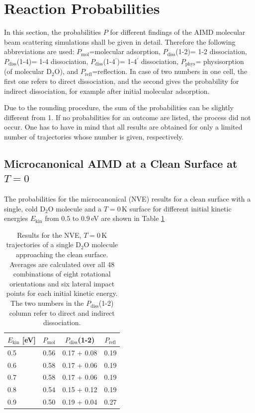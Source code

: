 \documentclass[11pt,DIV=13,BCOR=5mm,a4paper,headinclude]{scrbook}
\begin{document}
\section{Reaction Probabilities}\label{reactionprobabilities}
In this section, the probabilities $P$ for different findings of the AIMD molecular beam scattering simulations shall be given in detail.
Therefore the following abbreviations are used: $P_\textrm{mol}$=molecular adsorption, 
 $P_\textrm{diss}$(1-2)= 1-2 dissociation, $P_\textrm{diss}$(1-4)= 1-4 dissociation, $P_\textrm{diss}$(1-4$^\prime$)= 1-4$^\prime$ dissociation, $P_\textrm{phys}$= physisorption (of molecular D$_2$O), and $P_\textrm{refl}$=reflection.
In case of two numbers in one cell, the first one refers to direct dissociation, and the second gives the probability for indirect dissociation, for example after initial molecular adsorption.


Due to the rounding procedure, the sum of the probabilities can be slightly different from 1.
If no probabilities for an outcome are listed, the process did not occur.
One has to have in mind that all results are obtained for only a limited number of trajectories whose number is given, respectively.


\subsection{Microcanonical AIMD at a Clean Surface at $T=0$}
The probabilities for the microcanonical (NVE) results for a clean surface with a single, cold D$_2$O molecule and a $T=0\,$K surface for different initial kinetic energies $E_\textrm{kin}$ from $0.5$ to $0.9\,$eV are shown in Table \ref{tab:mic_ekin}

\begin{table}[!h]
 \centering
  \caption{Results for the NVE, $T=0\,$K trajectories of a single D$_2$O molecule approaching the clean surface.
Averages are calculated over all 48 combinations of eight rotational orientations and six lateral impact points for each initial kinetic energy. The two numbers in the $P_\textrm{diss}$(1-2) column refer to direct and indirect dissociation.}
%
 \begin{tabular}{l|ccc}
\toprule
 $E_\textrm{kin}$ [eV]&$P_\textrm{mol}$ & $P_\textrm{diss}$(1-2) & $P_\textrm{refl}$ \\\midrule
 0.5 & 0.56& 0.17 + 0.08& 0.19\\
 0.6 & 0.58& 0.17 + 0.06& 0.19\\
 0.7 & 0.58& 0.17 + 0.06& 0.19\\
 0.8 & 0.54& 0.15 + 0.12& 0.19\\
 0.9 & 0.50& 0.19 + 0.04& 0.27\\\bottomrule
\end{tabular}
 \label{tab:mic_ekin}
\end{table}
%
\end{document}
